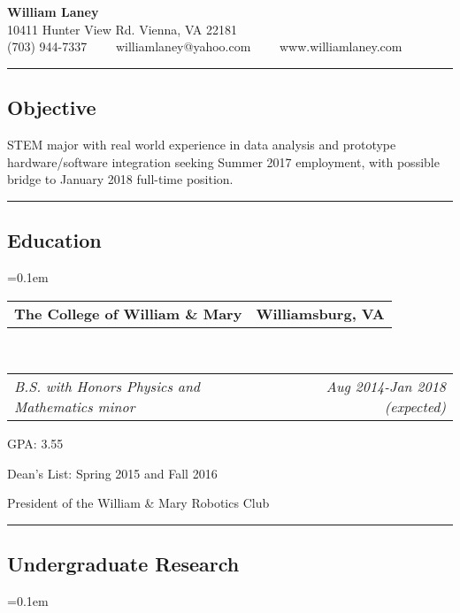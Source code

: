 \documentclass[10pt,letterpaper]{article}
\makeatletter
\newenvironment{indentsection}[1]%
{\begin{list}{}%
	{\setlength{\leftmargin}{#1}}%
	\item[]%
}
{\end{list}}
\newcommand{\headerrow}[2]
{\begin{tabular*}{\linewidth}{l@{\extracolsep{\fill}}r}
	#1 &
	#2 \\
\end{tabular*}}
\makeatother
\begin{document}
\begin{center}
{\LARGE \textbf{William Laney}}\\
\vspace{0.1em}
10411 Hunter View Rd.
Vienna, VA 22181
\\
(703) 944-7337\ \ \textbullet
\ \ williamlaney@yahoo.com\ \ \textbullet
\ \ www.williamlaney.com
\end{center}

\hrule
\vspace{-0.4em}
\subsection*{Objective}

\begin{indentsection}{\parindent}
STEM major with real world experience in data analysis and
prototype hardware/software integration seeking Summer 2017 employment,
with possible bridge to January 2018 full-time position.
\end{indentsection}


\hrule
\vspace{-0.4em}
\subsection*{Education}

	\parskip=0.1em

	\headerrow
		{\textbf{The College of William \& Mary}}
		{\textbf{Williamsburg, VA}}
	\\
	\headerrow
		{\emph{B.S. with Honors Physics and Mathematics minor}}
		{\emph{Aug 2014-Jan 2018 (expected)}}
	\begin{itemize*}
		\item GPA: 3.55
		\item Dean's List: Spring 2015 and Fall 2016
		\item President of the William \& Mary Robotics Club
	\end{itemize*}



\hrule
\vspace{-0.4em}
\subsection*{Undergraduate Research}

	\parskip=0.1em
\end{document}

